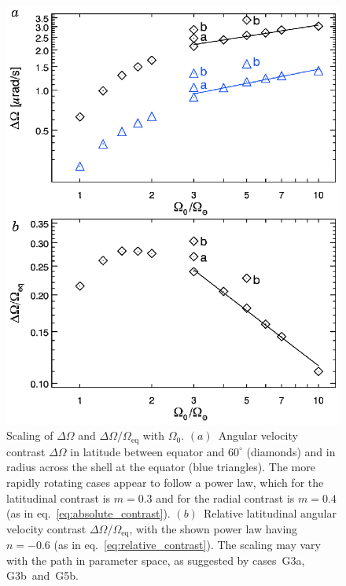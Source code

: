 \begin{figure}[!tb]
  \begin{center}
    \includegraphics[width=0.7\linewidth]{figs/chapter_3/Figure_10.eps}
  \end{center}
  \caption[Scaling of $\Delta \Omega$ and $\Delta
  \Omega/\Omega_{\textrm{eq}}$ with $\Omega_0$]
  {Scaling of $\Delta \Omega$ and $\Delta
  \Omega/\Omega_{\textrm{eq}}$ with $\Omega_0$.
  $(a)$~Angular velocity contrast $\Delta \Omega$ in latitude
  between equator and $60^\circ$ (diamonds)
  and in radius across the shell at the equator (blue triangles). 
  The more rapidly rotating cases appear to follow a power law, which
  for the latitudinal contrast is $m=0.3$ and for the radial contrast
  is $m=0.4$ (as in eq.~\ref{eq:absolute_contrast}).
  $(b)$~Relative latitudinal angular velocity contrast $\Delta
  \Omega/\Omega_{\textrm{eq}}$, with the shown power law having $n=-0.6$
  (as in eq.~\ref{eq:relative_contrast}). 
  The scaling may vary with the path in parameter
  space, as suggested by cases~G3a, G3b~and~G5b.
  \label{fig:ratios_of_omega}}
\end{figure}


